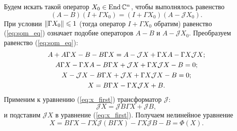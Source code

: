 
Будем искать такой оператор $X_0 \in \operatorname{End}\mathbb{C}^n$, чтобы выполнялось равенство
\begin{equation}\label{eq:som_eq}
	(A-B)(I + \Gamma X_0) = (I + \Gamma X_0)(A-\mathcal{J}X_0).
\end{equation}
При условии $\left\|\Gamma X_0\right\| \leqslant 1$ (тогда оператор $I + \Gamma X_0$ обратим) равенство (\ref{eq:som_eq}) означает подобие операторов $A-B$ и $A-\mathcal{J} X_0$. Преобразуем равенство (\ref{eq:som_eq}):
\begin{gather}
	A + A\Gamma X - B - B\Gamma X = A - \mathcal{J}X + \Gamma X A - \Gamma X \mathcal{J}X; \notag \\
	A\Gamma X - \Gamma X A - B\Gamma X + \mathcal{J}X + \Gamma X \mathcal{J}X - B = 0; \notag \\
	X - \mathcal{J}X - B\Gamma X + \mathcal{J}X + \Gamma X \mathcal{J}X - B = 0;  \notag \\
	X = B\Gamma X - \Gamma X \mathcal{J}X + B. \label{eq:x_first}
\end{gather}
Применим к уравнению (\ref{eq:x_first}) трансформатор $\mathcal{J}$:
$$
	\mathcal{J}X = \mathcal{J}B\Gamma X + \mathcal{J}B,
$$ 
и подставим $\mathcal{J}X$ в уравнение (\ref{eq:x_first}). Получаем нелинейное уравнение
\begin{equation}\label{eq:x_main}
	X = B\Gamma X - \Gamma X \mathcal{J}(B\Gamma X) - \Gamma X \mathcal{J}B - B = \Phi(X).
\end{equation}


